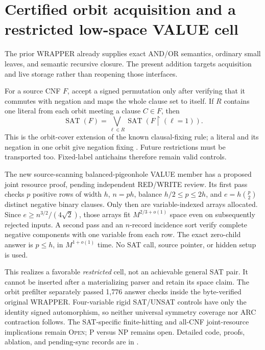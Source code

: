 \section{Certified orbit acquisition and a restricted low-space VALUE cell}
The prior WRAPPER already supplies exact AND/OR semantics, ordinary small leaves,
and semantic recursive closure. The present addition targets acquisition and
live storage rather than reopening those interfaces.

For a source CNF $F$, accept a signed permutation only after verifying that it
commutes with negation and maps the whole clause set to itself. If $R$ contains
one literal from each orbit meeting a clause $C\in F$, then
\[
 \operatorname{SAT}(F)=\bigvee_{\ell\in R}
 \operatorname{SAT}(F\upharpoonright(\ell=1)).
\]
This is the orbit-cover extension of the known clausal-fixing rule; a literal
and its negation in one orbit give negation fixing
\cite[Theorems~3.2--3.3]{arc0005Orbitopal}. Future restrictions must be
transported too. Fixed-label antichains therefore remain valid controls.

The new source-scanning balanced-pigeonhole VALUE member has a proposed joint
resource proof, pending independent RED/WRITE review. Its first pass checks
$p$ positive rows of width $h$, $n=ph$, balance $h/2\le p\le2h$, and
$e=h\binom p2$ distinct negative binary clauses. Only then are variable-indexed
arrays allocated. Since $e\ge n^{3/2}/(4\sqrt2)$, those arrays fit
$M^{2/3+o(1)}$ space even on subsequently rejected inputs. A second pass and
an $n$-record incidence sort verify complete negative components with one
variable from each row. The exact zero-child answer is $p\le h$, in
$M^{1+o(1)}$ time. No SAT call, source pointer, or hidden setup is used.

This realizes a favorable \emph{restricted} cell, not an achievable general
SAT pair. It cannot be inserted after a materializing parser and retain its
space claim. The orbit prefilter separately passed 1,776 answer checks inside
the byte-verified original WRAPPER. Four-variable rigid SAT/UNSAT controls
have only the identity signed automorphism, so neither universal symmetry
coverage nor ARC contraction follows. The SAT-specific finite-hitting and
all-CNF joint-resource implications remain \textsc{Open}; P versus NP
remains open. Detailed code, proofs, ablation, and pending-sync records are in
.
